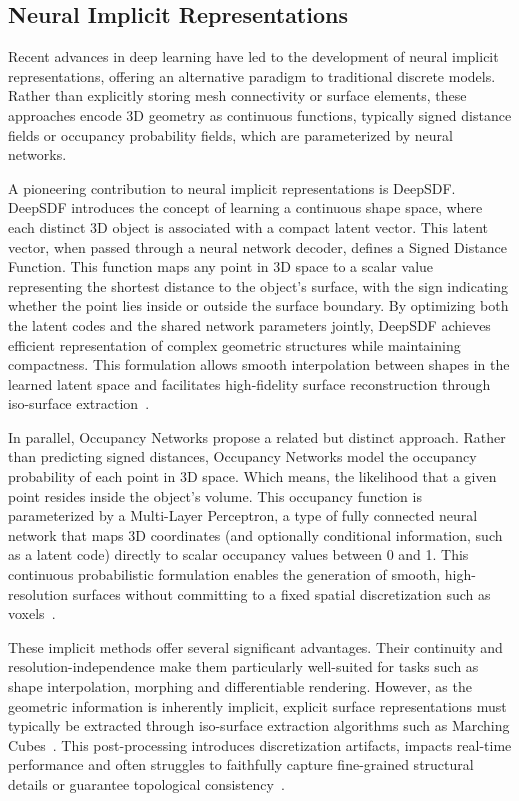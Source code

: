 \subsection{Neural Implicit Representations}

Recent advances in deep learning have led to the development of neural implicit representations, offering an alternative paradigm to traditional discrete models.  
Rather than explicitly storing mesh connectivity or surface elements, these approaches encode 3D geometry as continuous functions, typically signed distance fields or occupancy probability fields, which are parameterized by neural networks.  

A pioneering contribution to neural implicit representations is DeepSDF.  
DeepSDF introduces the concept of learning a continuous shape space, where each distinct 3D object is associated with a compact latent vector.  
This latent vector, when passed through a neural network decoder, defines a Signed Distance Function.  
This function maps any point in 3D space to a scalar value representing the shortest distance to the object's surface, with the sign indicating whether the point lies inside or outside the surface boundary.  
By optimizing both the latent codes and the shared network parameters jointly, DeepSDF achieves efficient representation of complex geometric structures while maintaining compactness.  
This formulation allows smooth interpolation between shapes in the learned latent space and facilitates high-fidelity surface reconstruction through iso-surface extraction~\cite{park2019}.  

In parallel, Occupancy Networks propose a related but distinct approach.  
Rather than predicting signed distances, Occupancy Networks model the occupancy probability of each point in 3D space.  
Which means, the likelihood that a given point resides inside the object's volume.  
This occupancy function is parameterized by a Multi-Layer Perceptron, a type of fully connected neural network that maps 3D coordinates (and optionally conditional information, such as a latent code) directly to scalar occupancy values between 0 and 1.  
This continuous probabilistic formulation enables the generation of smooth, high-resolution surfaces without committing to a fixed spatial discretization such as voxels~\cite{mescheder2019}.  

These implicit methods offer several significant advantages.  
Their continuity and resolution-independence make them particularly well-suited for tasks such as shape interpolation, morphing and differentiable rendering.  
However, as the geometric information is inherently implicit, explicit surface representations must typically be extracted through iso-surface extraction algorithms such as Marching Cubes~\cite{lorensen1987}.  
This post-processing introduces discretization artifacts, impacts real-time performance and often struggles to faithfully capture fine-grained structural details or guarantee topological consistency~\cite{sitzmann2020}.  

